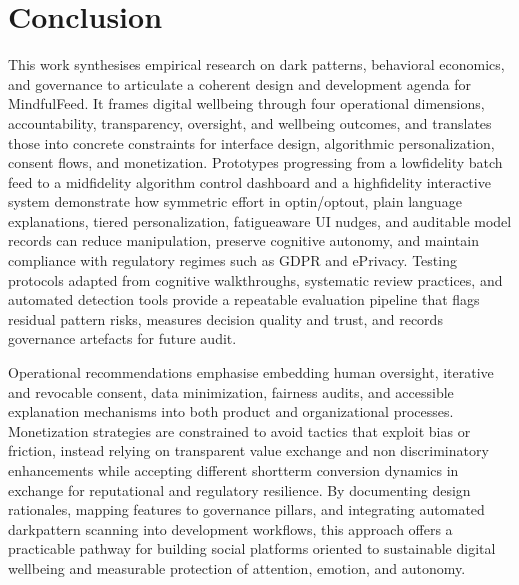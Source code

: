 \documentclass{article}
\begin{document}
\section{Conclusion}
This work synthesises empirical research on dark patterns, behavioral economics, and governance to articulate a coherent design and development agenda for MindfulFeed. It frames digital well\-being through four operational dimensions, accountability, transparency, oversight, and well\-being outcomes, and translates those into concrete constraints for interface design, algorithmic personalization, consent flows, and monetization. Prototypes progressing from a low\-fidelity batch feed to a mid\-fidelity algorithm control dashboard and a high\-fidelity interactive system demonstrate how symmetric effort in opt\-in/opt\-out, plain language explanations, tiered personalization, fatigue\-aware UI nudges, and auditable model records can reduce manipulation, preserve cognitive autonomy, and maintain compliance with regulatory regimes such as GDPR and ePrivacy. Testing protocols adapted from cognitive walkthroughs, systematic review practices, and automated detection tools provide a repeatable evaluation pipeline that flags residual pattern risks, measures decision quality and trust, and records governance artefacts for future audit.

Operational recommendations emphasise embedding human oversight, iterative and revocable consent, data minimization, fairness audits, and accessible explanation mechanisms into both product and organizational processes. Monetization strategies are constrained to avoid tactics that exploit bias or friction, instead relying on transparent value exchange and non discriminatory enhancements while accepting different short\-term conversion dynamics in exchange for reputational and regulatory resilience. By documenting design rationales, mapping features to governance pillars, and integrating automated dark\-pattern scanning into development workflows, this approach offers a practicable pathway for building social platforms oriented to sustainable digital well\-being and measurable protection of attention, emotion, and autonomy.

\newpage
\printbibliography
\end{document}
